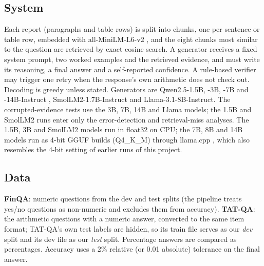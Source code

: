 \subsection{System}
Each report (paragraphs and table rows) is split into chunks, one per sentence or table row, embedded with all-MiniLM-L6-v2 \citep{reimers2019sbert}, and the eight chunks most similar to the question are retrieved by exact cosine search.
A generator receives a fixed system prompt, two worked examples and the retrieved evidence, and must write its reasoning, a final answer and a self-reported confidence.
A rule-based verifier may trigger one retry when the response's own arithmetic does not check out.
Decoding is greedy unless stated.
Generators are Qwen2.5-1.5B, -3B, -7B and -14B-Instruct \citep{qwen2024qwen25}, SmolLM2-1.7B-Instruct \citep{allal2025smollm2} and Llama-3.1-8B-Instruct.
The corrupted-evidence tests use the 3B, 7B, 14B and Llama models; the 1.5B and SmolLM2 runs enter only the error-detection and retrieval-miss analyses.
The 1.5B, 3B and SmolLM2 models run in float32 on CPU; the 7B, 8B and 14B models run as 4-bit GGUF builds (Q4\_K\_M) through llama.cpp \citep{gerganov2023llamacpp}, which also resembles the 4-bit setting of earlier runs of this project.

\subsection{Data}
\textbf{FinQA}: numeric questions from the dev and test splits (the pipeline treats yes/no questions as non-numeric and excludes them from accuracy).
\textbf{TAT-QA}: the arithmetic questions with a numeric answer, converted to the same item format; TAT-QA's own test labels are hidden, so its train file serves as our \emph{dev} split and its dev file as our \emph{test} split.
Percentage answers are compared as percentages.
Accuracy uses a 2\% relative (or 0.01 absolute) tolerance on the final answer.

